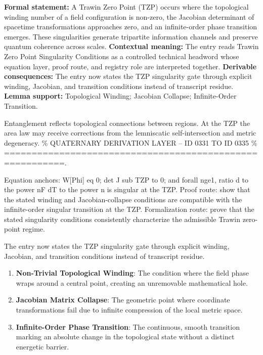 \begingroup\footnotesize\setlength{\emergencystretch}{3em}\sloppy
\textbf{Formal statement:} A Trawin Zero Point (TZP) occurs where the topological winding number of a field configuration is non-zero, the Jacobian determinant of spacetime transformations approaches zero, and an infinite-order phase transition emerges. These singularities generate tripartite information channels and preserve quantum coherence across scales. \textbf{Contextual meaning:} The entry reads Trawin Zero Point Singularity Conditions as a controlled technical headword whose equation layer, proof route, and registry role are interpreted together. \textbf{Derivable consequences:} The entry now states the TZP singularity gate through explicit winding, Jacobian, and transition conditions instead of transcript residue. \textbf{Lemma support:} Topological Winding; Jacobian Collapse; Infinite-Order Transition.\par
\endgroup

Entanglement reflects topological connections between regions. At the TZP the area law may receive corrections from the lemniscatic self-intersection and metric degeneracy. \% QUATERNARY DERIVATION LAYER -- ID 0331 TO ID 0335 \% =========================================================.

Equation anchors: W[Phi] eq 0; det J sub TZP to 0; and forall nge1, ratio d to the power nF dT to the power n is singular at the TZP. Proof route: show that the stated winding and Jacobian-collapse conditions are compatible with the infinite-order singular transition at the TZP. Formalization route: prove that the stated singularity conditions consistently characterize the admissible Trawin zero-point regime.

The entry now states the TZP singularity gate through explicit winding, Jacobian, and transition conditions instead of transcript residue.
\endgroup

\begin{enumerate}[leftmargin=1.6em,itemsep=6pt,topsep=4pt]
\item \textbf{Non-Trivial Topological Winding}: The condition where the field phase wraps around a central point, creating an unremovable mathematical hole.
\item \textbf{Jacobian Matrix Collapse}: The geometric point where coordinate transformations fail due to infinite compression of the local metric space.
\item \textbf{Infinite-Order Phase Transition}: The continuous, smooth transition marking an absolute change in the topological state without a distinct energetic barrier.
\end{enumerate}

